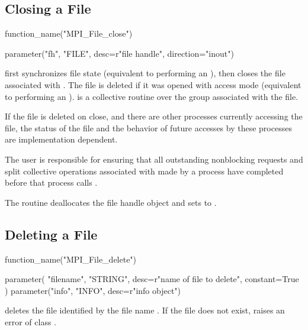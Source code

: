 \subsection{Closing a File}
\label{sec:io-filecntl-close}

%
\begin{mpi-binding}
    function_name("MPI_File_close")
    
    parameter("fh", "FILE", desc=r"file handle", direction="inout")
\end{mpi-binding}

 first synchronizes file state
(equivalent to performing an ),
then closes the file associated with .
The file is deleted if it was opened with access mode
(equivalent to performing an ).
 is a collective routine over the group associated with the file.

\begin{users}
If the file is deleted on close, and there are
other processes currently accessing the file,
the status of the file and the behavior of future accesses
by these processes are implementation dependent.
\end{users}

The user is responsible for ensuring that all outstanding
nonblocking requests and split collective
operations associated with 
made by a process have completed
before that process calls .

The  routine deallocates the file handle object
and sets  to .

\subsection{Deleting a File}
\label{sec:io-filecntl-delete}

%
\begin{mpi-binding}
    function_name("MPI_File_delete")
    
    parameter(
        "filename", "STRING", desc=r"name of file to delete", constant=True
    )
    parameter("info", "INFO", desc=r"info object")
\end{mpi-binding}

 deletes the file
identified by the file name .
If the file does not exist,  raises an
error of class .

